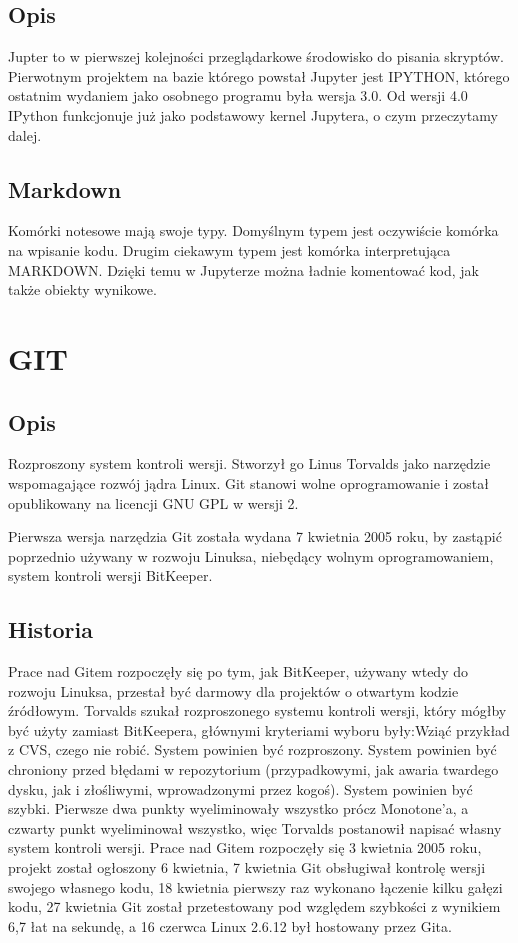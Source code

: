 \documentclass{article}
\begin{document}
\subsection{Opis}
Jupter to w pierwszej kolejności przeglądarkowe środowisko do pisania skryptów. Pierwotnym projektem na bazie którego powstał Jupyter jest IPYTHON, którego ostatnim wydaniem jako osobnego programu była wersja 3.0. Od wersji 4.0 IPython funkcjonuje już jako podstawowy kernel Jupytera, o czym przeczytamy dalej.
\subsection{Markdown}
Komórki notesowe mają swoje typy. Domyślnym typem jest oczywiście komórka na wpisanie kodu. Drugim ciekawym typem jest komórka interpretująca MARKDOWN. Dzięki temu w Jupyterze można ładnie komentować kod, jak także obiekty wynikowe.
\newpage
\section{GIT}
\subsection{Opis}
Rozproszony system kontroli wersji. Stworzył go Linus Torvalds jako narzędzie wspomagające rozwój jądra Linux. Git stanowi wolne oprogramowanie i został opublikowany na licencji GNU GPL w wersji 2.

Pierwsza wersja narzędzia Git została wydana 7 kwietnia 2005 roku, by zastąpić poprzednio używany w rozwoju Linuksa, niebędący wolnym oprogramowaniem, system kontroli wersji BitKeeper.
\subsection{Historia}
Prace nad Gitem rozpoczęły się po tym, jak BitKeeper, używany wtedy do rozwoju Linuksa, przestał być darmowy dla projektów o otwartym kodzie źródłowym. Torvalds szukał rozproszonego systemu kontroli wersji, który mógłby być użyty zamiast BitKeepera, głównymi kryteriami wyboru były:Wziąć przykład z CVS, czego nie robić. System powinien być rozproszony.
System powinien być chroniony przed błędami w repozytorium (przypadkowymi, jak awaria twardego dysku, jak i złośliwymi, wprowadzonymi przez kogoś).
System powinien być szybki. Pierwsze dwa punkty wyeliminowały wszystko prócz Monotone'a, a czwarty punkt wyeliminował wszystko, więc Torvalds postanowił napisać własny system kontroli wersji.
Prace nad Gitem rozpoczęły się 3 kwietnia 2005 roku, projekt został ogłoszony 6 kwietnia, 7 kwietnia Git obsługiwał kontrolę wersji swojego własnego kodu, 18 kwietnia pierwszy raz wykonano łączenie kilku gałęzi kodu, 27 kwietnia Git został przetestowany pod względem szybkości z wynikiem 6,7 łat na sekundę, a 16 czerwca Linux 2.6.12 był hostowany przez Gita.
\end{document}
